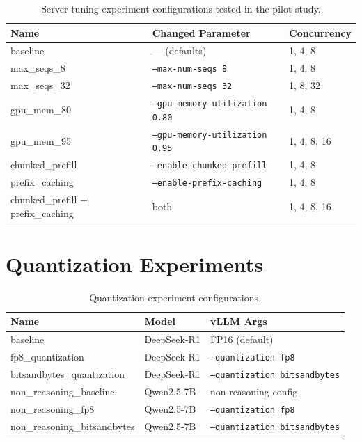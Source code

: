 \documentclass[a4paper,12pt]{report}
\begin{document}
\begin{table}[h!]
\caption{Server tuning experiment configurations tested in the pilot study.}
\centering
\begin{tabular}{|l|l|l|}
\hline
\textbf{Name} & \textbf{Changed Parameter} & \textbf{Concurrency} \\
\hline
baseline & --- (defaults) & 1, 4, 8 \\
max\_seqs\_8 & \texttt{--max-num-seqs 8} & 1, 4, 8 \\
max\_seqs\_32 & \texttt{--max-num-seqs 32} & 1, 8, 32 \\
gpu\_mem\_80 & \texttt{--gpu-memory-utilization 0.80} & 1, 4, 8 \\
gpu\_mem\_95 & \texttt{--gpu-memory-utilization 0.95} & 1, 4, 8, 16 \\
chunked\_prefill & \texttt{--enable-chunked-prefill} & 1, 4, 8 \\
prefix\_caching & \texttt{--enable-prefix-caching} & 1, 4, 8 \\
chunked\_prefill + prefix\_caching & both & 1, 4, 8, 16 \\
\hline
\end{tabular}
\end{table}

\section{Quantization Experiments}

\begin{table}[h!]
\caption{Quantization experiment configurations.}
\centering
\begin{tabular}{|l|l|l|}
\hline
\textbf{Name} & \textbf{Model} & \textbf{vLLM Args} \\
\hline
baseline & DeepSeek-R1 & FP16 (default) \\
fp8\_quantization & DeepSeek-R1 & \texttt{--quantization fp8} \\
bitsandbytes\_quantization & DeepSeek-R1 & \texttt{--quantization bitsandbytes} \\
non\_reasoning\_baseline & Qwen2.5-7B & non-reasoning config \\
non\_reasoning\_fp8 & Qwen2.5-7B & \texttt{--quantization fp8} \\
non\_reasoning\_bitsandbytes & Qwen2.5-7B & \texttt{--quantization bitsandbytes} \\
\hline
\end{tabular}
\end{table}
\end{document}
